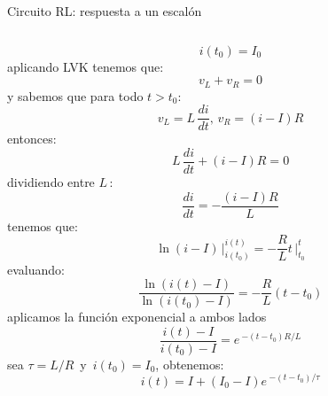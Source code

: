 \documentclass[aspectratio=169]{beamer}
\begin{document}
\begin{frame}{Circuito RL: respuesta a un escalón}
\begin{columns}[onlytextwidth]
\begin{column}{0.5\textwidth}
{\begin{equation*}
            i(t_0) = I_0
        \end{equation*}
        }
            {
            {aplicando LVK tenemos que:
            \begin{equation*}
                v_L + v_R = 0
            \end{equation*}
            }
            {y sabemos que para todo $t>t_0$: 
            \begin{equation*}
                v_L = L\,\dfrac{di}{dt},\, v_R=(i-I)R
            \end{equation*}
            }
            {entonces:
            \begin{equation*}
                L\,\dfrac{di}{dt} + (i-I)R = 0
            \end{equation*}
            }
        }
            {
            {dividiendo entre $L\,$:
            \begin{equation*}
                \dfrac{di}{dt} = -\dfrac{(i-I)R}{L}
            \end{equation*}
            }
        }
            {
            {tenemos que:
            \begin{equation*}
                \ln(i-I)\,\bigg|_{i(t_0)}^{i(t)} = -\frac{R}{L}t\,\bigg|_{t_0}^{t}
            \end{equation*}
            }
            {evaluando:
            \begin{equation*}
                \dfrac{\ln(i(t)-I)}{\ln (i(t_0)-I)} = -\frac{R}{L}(t - t_0)
            \end{equation*}
            }
        }
            {
            {aplicamos la función exponencial a ambos lados
            \begin{equation*}
                \dfrac{i(t)-I}{i(t_0)-I} = e\,^{-(t - t_0)R/L}
            \end{equation*}
            }
            {sea $\tau=L/R\,$ y $\,i(t_0) = I_0$, obtenemos:
            \begin{equation*}
                i(t)=I + (I_0-I)e\,^{-(t - t_0)/ \tau}
            \end{equation*}
}}
\end{column}
\end{columns}
\end{frame}
\end{document}
